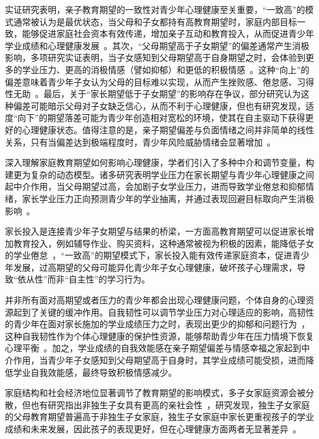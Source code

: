 \documentclass[zihao = -4, linespread = 1.5]{article}
\begin{document}
实证研究表明，亲子教育期望的一致性对青少年心理健康至关重要，“一致高”的模式通常被认为是最优状态，当父母和子女都持有高教育期望时，家庭内部目标一致，能够促进家庭社会资本有效传递，增加亲子互动和教育投入，从而促进青少年学业成绩和心理健康发展~\citep{YangXue}。其次，“父母期望高于子女期望”的偏差通常产生消极影响，多项研究实证表明，当子女感知到父母期望高于自身期望之时，会体验到更多的学业压力、更高的消极情感（譬如抑郁）和更低的积极情感~\citep{GuoXiaoLin}。这种“向上”的偏差意味着青少年子女认为父母的目标难以实现，从而产生挫败感、倦怠感、习得性无助~\citep{Burnout}。最后，关于“家长期望低于子女期望”的影响存在争议，部分研究认为这种偏差可能暗示父母对子女缺乏信心，从而不利于心理健康，但也有研究发现，适度“向下”的期望落差可能为青少年创造相对宽松的环境，使其在自主驱动下获得更好的心理健康状态。值得注意的是，亲子期望偏差与负面情绪之间并非简单的线性关系，只有当偏差达到极端程度时，青少年风险威胁情绪会显著增加~\citep{LiWenZhe}。

深入理解家庭教育期望如何影响心理健康，学者们引入了多种中介和调节变量，构建更为复杂的动态模型。诸多研究表明学业压力在家长期望与青少年心理健康之间起中介作用，当父母期望过高，会加剧子女学业压力，进而导致学业倦怠和抑郁情绪，家长学业压力正向预测青少年的学业抽离，并通过表现回避目标取向产生消极影响~\citep{ZhangYunYun}。

家长投入是连接青少年子女期望与结果的桥梁，一方面高教育期望可以促进家长增加教育投入，例如辅导作业、购买资料，这种通常被视为积极的因素，能降低子女的学业倦怠~\citep{LiRuoXuan}，“一致高”的期望模式下，家长投入能有效传递家庭资本，促进青少年发展，过高期望的父母可能异化青少年子女心理健康，破坏孩子心理需求，导致“依从性”而非“自主性”的学习行为。

并非所有面对高期望或者压力的青少年都会出现心理健康问题，个体自身的心理资源起到了关键的缓冲作用。自我韧性可以调节学业压力对心理适应的影响，高韧性的青少年在面对家长施加的学业成绩压力之时，表现出更少的抑郁和问题行为~\citep{XiongMingLing}，这种自我韧性作为个体心理健康的保护性资源，能够帮助青少年在压力情境下恢复心理平衡~\citep{Burnout}。加之，学业成绩的自我效能感在亲子期望偏差与情感幸福之家起到中介作用，当青少年子女感知到父母期望高于自身时，其学业成绩可能受损，进而降低学业自我效能感，最终导致积极情感减少。

家庭结构和社会经济地位显著调节了教育期望的影响模式，多子女家庭资源会被分散，但也有研究指出非独生子女具有更高的亲社会性~\citep{ChengYaWen}，研究发现，独生子女家庭的父母教育期望普遍高于非独生子女家庭，独生子女家庭中家长更重视孩子的学业成绩和未来发展，因此孩子的表现更好，但在心理健康方面两者无显著差异~\citep{Differences}。
\end{document}
